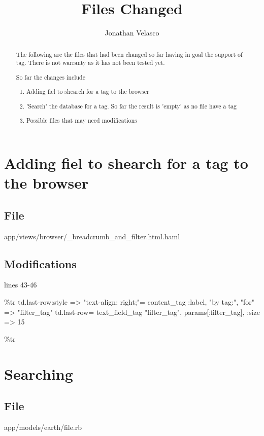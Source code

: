 \documentclass[a4paper,10pt]{article}
\title{Files Changed}
\author{Jonathan Velasco}
\begin{document}
\maketitle

\begin{abstract}

The following are the files that had been changed so far having in goal the support of tag.  There is not warranty as it has not been tested yet.  

So far the changes include

\begin{enumerate}
 \item Adding fiel to shearch for a tag to the browser
 \item 'Search' the database for a tag.  So far the result is 'empty' as no file have a tag
 \item Possible files that may need modifications
\end{enumerate}


\end{abstract}

\section{Adding fiel to shearch for a tag to the browser}

\subsection*{File}
app/views/browser/\_breadcrumb\_and\_filter.html.haml

\subsection*{Modifications}
lines 43-46

\%tr
   td.last-row{:style => "text-align: right;"}= content\_tag :label, "by tag:", "for" => "filter\_tag"
   td.last-row= text\_field\_tag "filter\_tag", params[:filter\_tag], :size => 15

\%tr


\section{Searching}

\subsection*{File}
 app/models/earth/file.rb
\end{document}
